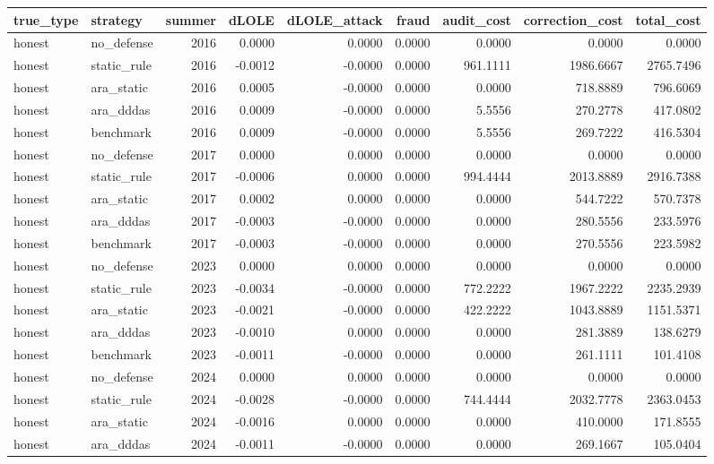 \begin{tabular}{llrrrrrrr}
\toprule
true_type & strategy & summer & dLOLE & dLOLE_attack & fraud & audit_cost & correction_cost & total_cost \\
\midrule
honest & no_defense & 2016 & 0.0000 & 0.0000 & 0.0000 & 0.0000 & 0.0000 & 0.0000 \\
honest & static_rule & 2016 & -0.0012 & -0.0000 & 0.0000 & 961.1111 & 1986.6667 & 2765.7496 \\
honest & ara_static & 2016 & 0.0005 & -0.0000 & 0.0000 & 0.0000 & 718.8889 & 796.6069 \\
honest & ara_dddas & 2016 & 0.0009 & -0.0000 & 0.0000 & 5.5556 & 270.2778 & 417.0802 \\
honest & benchmark & 2016 & 0.0009 & -0.0000 & 0.0000 & 5.5556 & 269.7222 & 416.5304 \\
honest & no_defense & 2017 & 0.0000 & 0.0000 & 0.0000 & 0.0000 & 0.0000 & 0.0000 \\
honest & static_rule & 2017 & -0.0006 & 0.0000 & 0.0000 & 994.4444 & 2013.8889 & 2916.7388 \\
honest & ara_static & 2017 & 0.0002 & 0.0000 & 0.0000 & 0.0000 & 544.7222 & 570.7378 \\
honest & ara_dddas & 2017 & -0.0003 & -0.0000 & 0.0000 & 0.0000 & 280.5556 & 233.5976 \\
honest & benchmark & 2017 & -0.0003 & -0.0000 & 0.0000 & 0.0000 & 270.5556 & 223.5982 \\
honest & no_defense & 2023 & 0.0000 & 0.0000 & 0.0000 & 0.0000 & 0.0000 & 0.0000 \\
honest & static_rule & 2023 & -0.0034 & -0.0000 & 0.0000 & 772.2222 & 1967.2222 & 2235.2939 \\
honest & ara_static & 2023 & -0.0021 & -0.0000 & 0.0000 & 422.2222 & 1043.8889 & 1151.5371 \\
honest & ara_dddas & 2023 & -0.0010 & 0.0000 & 0.0000 & 0.0000 & 281.3889 & 138.6279 \\
honest & benchmark & 2023 & -0.0011 & -0.0000 & 0.0000 & 0.0000 & 261.1111 & 101.4108 \\
honest & no_defense & 2024 & 0.0000 & 0.0000 & 0.0000 & 0.0000 & 0.0000 & 0.0000 \\
honest & static_rule & 2024 & -0.0028 & -0.0000 & 0.0000 & 744.4444 & 2032.7778 & 2363.0453 \\
honest & ara_static & 2024 & -0.0016 & 0.0000 & 0.0000 & 0.0000 & 410.0000 & 171.8555 \\
honest & ara_dddas & 2024 & -0.0011 & -0.0000 & 0.0000 & 0.0000 & 269.1667 & 105.0404 \\

\end{tabular}
